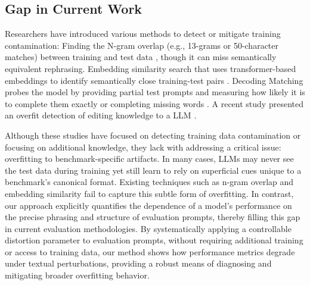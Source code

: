 \subsection{Gap in Current Work}
Researchers have introduced various methods to detect or mitigate training contamination: Finding the N-gram overlap  (e.g., 13-grams or 50-character matches) between training and test data \cite{brown2020language,openai2023gpt}, though it can miss semantically equivalent rephrasing.
Embedding similarity search \cite{reimers2019sentence} that uses transformer-based embeddings to identify semantically close training-test pairs \cite{lee2023platypus}. Decoding Matching probes the model by providing partial test prompts and measuring how likely it is to complete them exactly \cite{li2023estimating} or completing missing words \cite{deng2023investigating}. A recent study presented an overfit detection of editing knowledge to a LLM \cite{zhang2025uncovering}. 

Although these studies have focused on detecting training data contamination or focusing on additional knowledge, they lack with addressing a critical issue: overfitting to benchmark-specific artifacts. In many cases, LLMs may never see the test data during training yet still learn to rely on superficial cues unique to a benchmark's canonical format. Existing techniques such as n-gram overlap and embedding similarity fail to capture this subtle form of overfitting. In contrast, our approach explicitly quantifies the dependence of a model's performance on the precise phrasing and structure of evaluation prompts, thereby filling this gap in current evaluation methodologies. By systematically applying a controllable distortion parameter to evaluation prompts, without requiring additional training or access to training data, our method shows how performance metrics degrade under textual perturbations, providing a robust means of diagnosing and mitigating broader overfitting behavior.